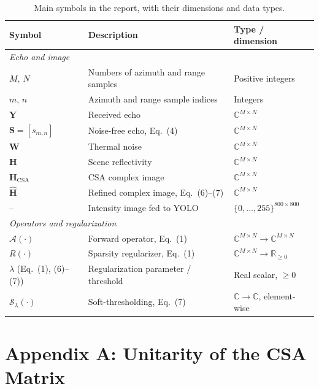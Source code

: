 \documentclass[12pt]{article}
\begin{document}
\begin{table}[H]
  \centering
  \small
  \caption{Main symbols in the report, with their dimensions and data types.}
  \label{tab:symbols}
  \begin{tabular}{lll}
    \toprule
    Symbol & Description & Type / dimension \\
    \midrule
    \multicolumn{3}{l}{\textit{Echo and image}} \\
    $M$, $N$ & Numbers of azimuth and range samples & Positive integers \\
    $m$, $n$ & Azimuth and range sample indices & Integers \\
    $\mathbf{Y}$ & Received echo & $\mathbb{C}^{M \times N}$ \\
    $\mathbf{S} = [s_{m,n}]$ & Noise-free echo, Eq.~(4) & $\mathbb{C}^{M \times N}$ \\
    $\mathbf{W}$ & Thermal noise & $\mathbb{C}^{M \times N}$ \\
    $\mathbf{H}$ & Scene reflectivity & $\mathbb{C}^{M \times N}$ \\
    $\mathbf{H}_{\mathrm{CSA}}$ & CSA complex image & $\mathbb{C}^{M \times N}$ \\
    $\hat{\mathbf{H}}$ & Refined complex image, Eq.~(6)--(7) & $\mathbb{C}^{M \times N}$ \\
    -- & Intensity image fed to YOLO & $\{0, \dots, 255\}^{800 \times 800}$ \\
    \midrule
    \multicolumn{3}{l}{\textit{Operators and regularization}} \\
    $\mathcal{A}(\cdot)$ & Forward operator, Eq.~(1) & $\mathbb{C}^{M \times N} \to \mathbb{C}^{M \times N}$ \\
    $R(\cdot)$ & Sparsity regularizer, Eq.~(1) & $\mathbb{C}^{M \times N} \to \mathbb{R}_{\ge 0}$ \\
    $\lambda$ (Eq.~(1), (6)--(7)) & Regularization parameter / threshold & Real scalar, $\ge 0$ \\
    $\mathcal{S}_\lambda(\cdot)$ & Soft-thresholding, Eq.~(7) & $\mathbb{C} \to \mathbb{C}$, element-wise \\
    \bottomrule
  \end{tabular}
\end{table}

\newpage
\section*{Appendix A: Unitarity of the CSA Matrix}
\end{document}
